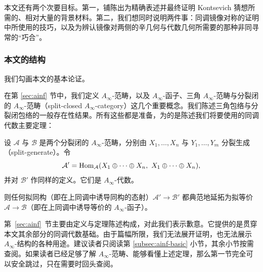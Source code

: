 本文还有两个次要目标。第一，铺陈出为精确表述并最终证明 Kontsevich 猜想所需的、相对大量的背景材料。第二，我们想同时说明两件事：同调镜像对称的证明中所使用的技巧，以及为辨认镜像对两侧的辛几何与代数几何所需要的那种非同寻常的“巧合”。

\subsubsection*{本文的结构}

我们勾画本文的基本论证。

在第 \ref{sec:ainf} 节中，我们定义 $A_\infty$-范畴，以及 $A_\infty$-函子、三角 $A_\infty$-范畴与分裂闭的 $A_\infty$-范畴（split-closed $A_\infty$-category）这几个重要概念。我们陈述三角包络与分裂闭包络的一般存在性结果。所有这些都是准备，为的是陈述我们将要使用的同调代数主要定理：

\begin{theorem}\label{thm:intro-main}
设 $\mathcal{A}$ 与 $\mathcal{B}$ 是两个分裂闭的 $A_\infty$-范畴，分别由 $X_1,\dots,X_n$ 与 $Y_1,\dots,Y_m$ 分裂生成（split-generate）。令
\[
  \mathcal{A}' = \operatorname{Hom}_{\mathcal{A}}(X_1\oplus\cdots\oplus X_n,\ X_1\oplus\cdots\oplus X_n),
\]
并对 $\mathcal{B}'$ 作同样的定义。它们是 $A_\infty$-代数。

则任何拟同构（即在上同调中诱导同构的态射）$\mathcal{A}'\to\mathcal{B}'$ 都典范地延拓为拟等价 $\mathcal{A}\to\mathcal{B}$（即在上同调中诱导等价的 $A_\infty$-函子）。
\end{theorem}


第~\ref{sec:ainf}~节主要由定义与定理陈述构成，对此我们表示歉意。它提供的是贯穿本文其余部分的同调代数基础。由于篇幅所限，我们无法展开证明，也无法展示 $A_\infty$-结构的各种用途。建议读者只阅读第 \ref{subsec:ainf-basic} 小节，其余小节按需查阅。如果读者已经足够了解 $A_\infty$-范畴、能够看懂上述定理，那么第一节完全可以安全跳过，只在需要时回头查阅。


